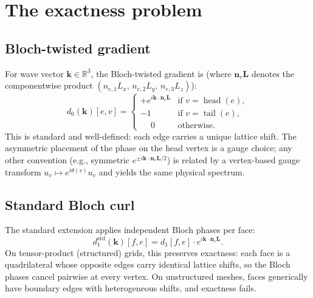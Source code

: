 \documentclass[preprint,12pt]{elsarticle}
\begin{document}
\section{The exactness problem}
\label{sec:problem}

\subsection{Bloch-twisted gradient}

For wave vector $\mathbf{k} \in \mathbb{R}^3$, the Bloch-twisted gradient is (where $\mathbf{n}_e\mathbf{L}$ denotes the componentwise product $(n_{e,1}L_x,\, n_{e,2}L_y,\, n_{e,3}L_z)$):
\begin{equation}\label{eq:d0k}
  d_0(\mathbf{k})[e,v] = \begin{cases}
    +e^{i\mathbf{k}\cdot\mathbf{n}_e\mathbf{L}} & \text{if } v = \operatorname{head}(e), \\
    -1 & \text{if } v = \operatorname{tail}(e), \\
    \phantom{+}0 & \text{otherwise}.
  \end{cases}
\end{equation}
This is standard and well-defined: each edge carries a unique lattice shift. The asymmetric placement of the phase on the head vertex is a gauge choice; any other convention (e.g., symmetric $e^{\pm i\mathbf{k}\cdot\mathbf{n}_e\mathbf{L}/2}$) is related by a vertex-based gauge transform $u_v \mapsto e^{i\theta(v)}u_v$ and yields the same physical spectrum.

\subsection{Standard Bloch curl}

The standard extension applies independent Bloch phases per face:
\begin{equation}\label{eq:d1std}
  d_1^{\mathrm{std}}(\mathbf{k})[f,e] = d_1[f,e] \cdot e^{i\mathbf{k}\cdot\mathbf{n}_e\mathbf{L}}.
\end{equation}
On tensor-product (structured) grids, this preserves exactness: each face is a quadrilateral whose opposite edges carry identical lattice shifts, so the Bloch phases cancel pairwise at every vertex. On unstructured meshes, faces generically have boundary edges with heterogeneous shifts, and exactness fails.
\end{document}
